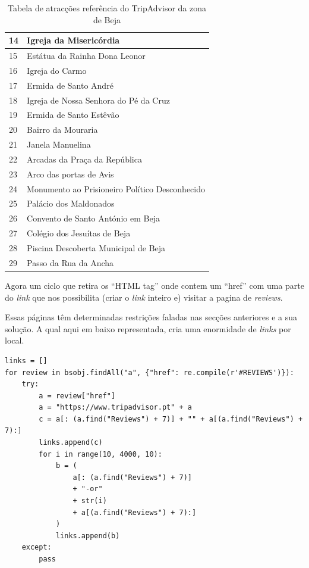 \documentclass[a4paper,10pt]{article}
\begin{document}
\begin{table}[!ht]
\begin{tabular}{|l|l|}
    14 & Igreja da Misericórdia                                 \\ \hline
    15 & Estátua da Rainha Dona Leonor                          \\ \hline
    16 & Igreja do Carmo                                        \\ \hline
    17 & Ermida de Santo André                                  \\ \hline
    18 & Igreja de Nossa Senhora do Pé da Cruz                  \\ \hline
    19 & Ermida de Santo Estêvão                                \\ \hline
    20 & Bairro da Mouraria                                     \\ \hline
    21 & Janela Manuelina                                       \\ \hline
    22 & Arcadas da Praça da República                          \\ \hline
    23 & Arco das portas de Avis                                \\ \hline
    24 & Monumento ao Prisioneiro Político Desconhecido         \\ \hline
    25 & Palácio dos Maldonados                                 \\ \hline
    26 & Convento de Santo António em Beja                      \\ \hline
    27 & Colégio dos Jesuítas de Beja                           \\ \hline
    28 & Piscina Descoberta Municipal de Beja                   \\ \hline
    29 & Passo da Rua da Ancha                                  \\ \hline
  \end{tabular}
  \caption{Tabela de atracções referência do TripAdvisor da zona de Beja}
\end{table}

Agora um ciclo que retira os ``HTML tag'' onde  contem um ``href'' com uma parte do \textit{link} que nos possibilita (criar o \textit{link} inteiro e) visitar a pagina de \textit{reviews}.

Essas páginas têm determinadas restrições faladas nas secções anteriores e a sua solução. A qual aqui em baixo representada, cria uma enormidade de \textit{links} por local.

\begin{verbatim}
links = []
for review in bsobj.findAll("a", {"href": re.compile(r'#REVIEWS')}):
    try:
        a = review["href"]
        a = "https://www.tripadvisor.pt" + a
        c = a[: (a.find("Reviews") + 7)] + "" + a[(a.find("Reviews") + 7):]
        links.append(c)
        for i in range(10, 4000, 10):
            b = (
                a[: (a.find("Reviews") + 7)]
                + "-or"
                + str(i)
                + a[(a.find("Reviews") + 7):]
            )
            links.append(b)
    except:
        pass
\end{verbatim}
\end{document}
